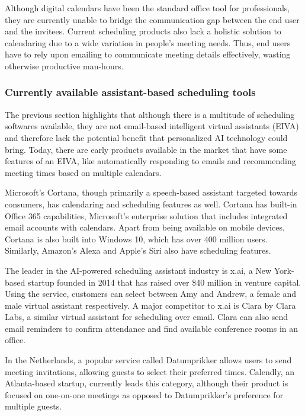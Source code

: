 \documentclass{article}
\begin{document}
Although digital calendars have been the standard office tool for professionals, they are currently unable to bridge the communication gap between the end user and the invitees. Current scheduling products also lack a holistic solution to calendaring due to a wide variation in people's meeting needs. Thus, end users have to rely upon emailing to communicate meeting details effectively, wasting otherwise productive man-hours.

\subsubsection{Currently available assistant-based scheduling tools}

The previous section highlights that although there is a multitude of scheduling softwares available, they are not email-based intelligent virtual assistants (EIVA) and therefore lack the potential benefit that personalized AI technology could bring. Today, there are early products available in the market that have some features of an EIVA, like automatically responding to emails and recommending meeting times based on multiple calendars.

Microsoft's Cortana, though primarily a speech-based assistant targeted towards consumers, has calendaring and scheduling features as well. Cortana has built-in Office 365 capabilities, Microsoft's enterprise solution that includes integrated email accounts with calendars. Apart from being available on mobile devices, Cortana is also built into Windows 10, which has over 400 million users. Similarly, Amazon's Alexa and Apple's Siri also have scheduling features.

The leader in the AI-powered scheduling assistant industry is x.ai, a New York-based startup founded in 2014 that has raised over \$40 million in venture capital. Using the service, customers can select between Amy and Andrew, a female and male virtual assistant respectively. A major competitor to x.ai is Clara by Clara Labs, a similar virtual assistant for scheduling over email. Clara can also send email reminders to confirm attendance and find available conference rooms in an office.

In the Netherlands, a popular service called Datumprikker allows users to send meeting invitations, allowing guests to select their preferred times. Calendly, an Atlanta-based startup, currently leads this category, although their product is focused on one-on-one meetings as opposed to Datumprikker's preference for multiple guests.
\end{document}
